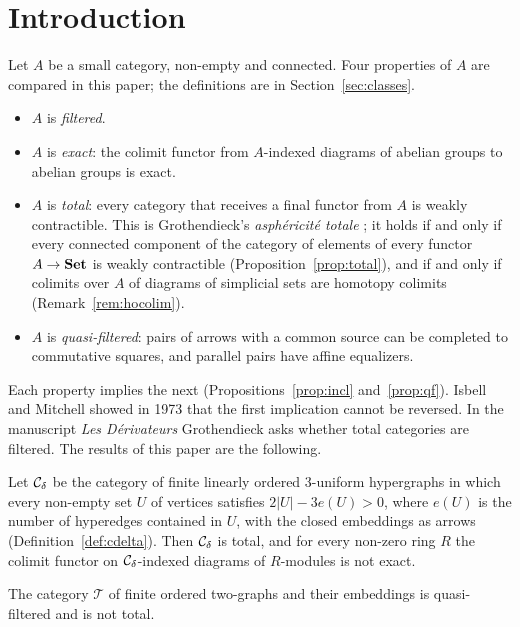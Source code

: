 \section{Introduction}

Let $A$ be a small category, non-empty and connected. Four properties of $A$
are compared in this paper; the definitions are in
Section~\ref{sec:classes}.
\begin{itemize}
\item $A$ is \emph{filtered}.
\item $A$ is \emph{exact}: the colimit functor from $A$-indexed diagrams of
 abelian groups to abelian groups is exact.
\item $A$ is \emph{total}: every category that receives a final functor from
 $A$ is weakly contractible. This is Grothendieck's \emph{asph\'ericit\'e
 totale} \cite{Der}; it holds if and only if every connected component of the
 category of elements of every functor $A\to\mathbf{Set}$ is weakly contractible
 (Proposition~\ref{prop:total}), and if and only if colimits over $A$ of
 diagrams of simplicial sets are homotopy colimits (Remark~\ref{rem:hocolim}).
\item $A$ is \emph{quasi-filtered}: pairs of arrows with a common source can be
 completed to commutative squares, and parallel pairs have affine equalizers.
\end{itemize}
Each property implies the next (Propositions~\ref{prop:incl}
and~\ref{prop:qf}). Isbell and Mitchell showed in 1973 that the first
implication cannot be reversed. In the manuscript \emph{Les D\'erivateurs}
Grothendieck asks whether total categories are filtered. The results of this
paper are the following.

\begin{theorem}\label{thm:A}
Let $\mathcal{C}_{\delta}$ be the category of finite linearly ordered $3$-uniform hypergraphs
in which every non-empty set $U$ of vertices satisfies $2|U|-3e(U)>0$, where
$e(U)$ is the number of hyperedges contained in $U$, with the closed
embeddings as arrows \textup{(}Definition~\ref{def:cdelta}\textup{)}. Then $\mathcal{C}_{\delta}$ is
total, and for every non-zero ring $R$ the colimit functor on $\mathcal{C}_{\delta}$-indexed
diagrams of $R$-modules is not exact.
\end{theorem}

\begin{theorem}\label{thm:B}
The category $\mathcal T$ of finite ordered two-graphs and their embeddings
is quasi-filtered and is not total.
\end{theorem}

